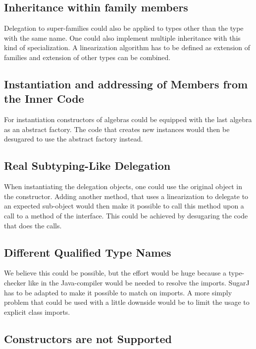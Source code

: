 \documentclass{report}
\begin{document}
\subsection{Inheritance within family members}

Delegation to super-families could also be applied to types other than the type with the same name. One could also implement multiple inheritance with this kind of specialization. A linearization algorithm has to be defined as extension of families and extension of other types can be combined.

\subsection{Instantiation and addressing of Members from the Inner Code}

For instantiation constructors of algebras could be equipped with the last algebra as an abstract factory. The code that creates new instances would then be desugared to use the abstract factory instead.

\subsection{Real Subtyping-Like Delegation}
\label{solutionRealSubtypingLikeDelegation}
When instantiating the delegation objects, one could use the original object in the constructor. Adding another method, that uses a linearization to delegate to an expected sub-object would then make it possible to call this method upon a call to a method of the interface. This could be achieved by desugaring the code that does the calls.

\subsection{Different Qualified Type Names}

We believe this could be possible, but the effort would be huge because a type-checker like in the Java-compiler would be needed to resolve the imports. SugarJ has to be adapted to make it possible to match on imports. A more simply problem that could be used with a little downside would be to limit the usage to explicit class imports.

\subsection{Constructors are not Supported}
\end{document}
